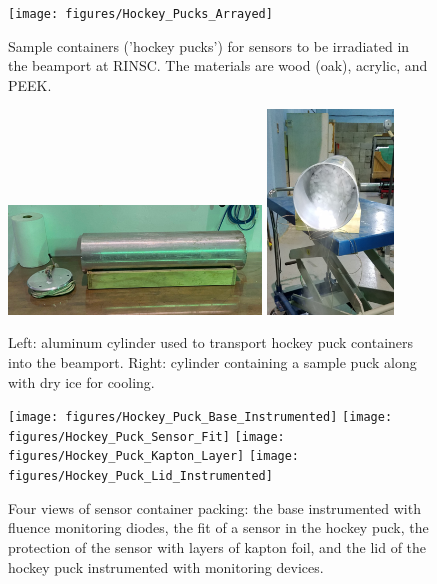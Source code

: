 \begin{figure}[!hbt]
  \begin{center}
    \texttt{[image: figures/Hockey\_Pucks\_Arrayed]}
    \caption{Sample containers ('hockey pucks') for sensors to be irradiated in the beamport at RINSC. The materials are wood (oak), acrylic, and PEEK.}
    \label{fig:Pucks_Arrayed}
  \end{center}
\end{figure}

\iffalse      %
\begin{figure}[!hbt]
  \begin{center}
    \includegraphics[width=0.60\textwidth]{figures/Cylinder_Side_View}
    \includegraphics[width=0.30\textwidth]{figures/Cylinder_With_Dry_Ice}
    \caption{Left: aluminum cylinder used to transport hockey puck containers into the beamport. Right: cylinder containing a sample puck along with dry ice for cooling.}
    \label{fig:Cylinder_Details}
  \end{center}
\end{figure}

\begin{figure}[!hbt]
  \begin{center}
    \texttt{[image: figures/Hockey\_Puck\_Base\_Instrumented]}  
    \texttt{[image: figures/Hockey\_Puck\_Sensor\_Fit]}
    \texttt{[image: figures/Hockey\_Puck\_Kapton\_Layer]}
    \texttt{[image: figures/Hockey\_Puck\_Lid\_Instrumented]}    
    \caption{Four views of sensor container packing: the base instrumented with fluence monitoring diodes, the fit of a sensor in the hockey puck, the protection of the sensor with layers of kapton foil, and the lid of the hockey puck instrumented with monitoring devices.}
    \label{fig:Puck_Packing}
  \end{center}
\end{figure}

